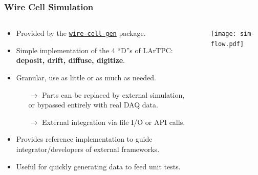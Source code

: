 \documentclass[xcolor=dvipsnames]{beamer}
\begin{document}
\begin{frame}

  \frametitle{Wire Cell Simulation}

  \begin{columns}
    \begin{column}{0.75\textwidth}
      \begin{itemize}\footnotesize
      \item Provided by the \href{https://github.com/WireCell/wire-cell-gen}{\texttt{wire-cell-gen}} package.
      \item Simple implementation of the 4 ``D''s of LArTPC:\\
        \textbf{deposit, drift, diffuse, digitize}.
      \item Granular, use as little or as much as needed.
        \begin{itemize}\scriptsize
        \item[$\rightarrow$] Parts can be replaced by external
          simulation, \\or bypassed entirely with real DAQ data.
        \item[$\rightarrow$] External integration via file I/O or API calls.
        \end{itemize}
      \item Provides reference implementation to guide integrator/developers of external frameworks.
      \item Useful for quickly generating data to feed unit tests.
      \end{itemize}
    \end{column}
    \begin{column}{0.25\textwidth}
      \vspace{-10mm}
      \texttt{[image: sim-flow.pdf]}
    \end{column}
  \end{columns}
\end{frame}
\end{document}
